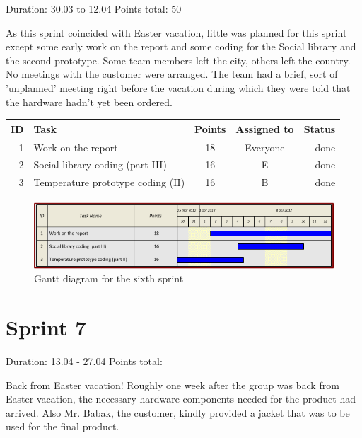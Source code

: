 Duration: 30.03 to 12.04
Points total: 50

As this sprint coincided with Easter vacation, little was planned for this
sprint except some early work on the report and some coding for the Social
library and the second prototype. Some team members left the city, others left
the country. No meetings with the customer were arranged. The team had a brief,
sort of 'unplanned' meeting right before the vacation during which they were
told that the hardware hadn't yet been ordered.

\begin{table}[ht!]
\begin{tabular}{ | r | l | c | c | r | }

\hline
\textbf{ID} & \textbf{Task} & \textbf{Points} & \textbf{Assigned to} & \textbf{Status} \\
\hline

1 & Work on the report					& 18 & Everyone & done \\
\hline
2 & Social library coding (part III)	& 16 & E		& done \\
\hline
3 & Temperature prototype coding (II)	& 16 & B		& done \\
\hline

\end{tabular}
\end{table}

\begin{figure}[h!]
\centering \includegraphics[scale=0.8]{img/sprints-gantt6.png}
\caption{Gantt diagram for the sixth sprint}
\label{fig:sprints-gantt6}
\end{figure}

\newpage

\section{Sprint 7}

Duration: 13.04 - 27.04
Points total:

Back from Easter vacation! Roughly one week after the group was back from
Easter vacation, the necessary hardware components needed for the product had
arrived. Also Mr. Babak, the customer, kindly provided a jacket that was to be
used for the final product.

